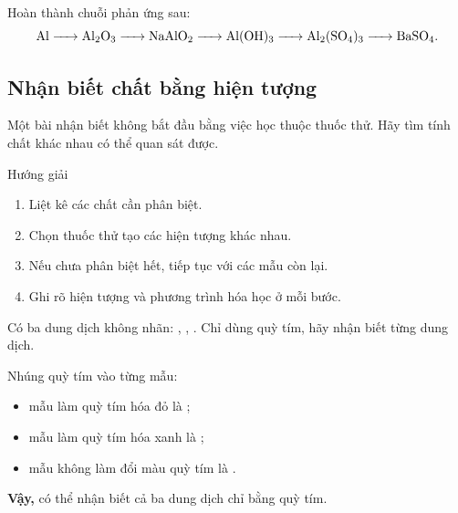 \begin{tuluyen}
Hoàn thành chuỗi phản ứng sau:
\[
\ce{Al -> Al2O3 -> NaAlO2 -> Al(OH)3 -> Al2(SO4)3 -> BaSO4}.
\]
\end{tuluyen}

\subsection{Nhận biết chất bằng hiện tượng}

Một bài nhận biết không bắt đầu bằng việc học thuộc thuốc thử. Hãy tìm tính chất khác nhau có thể quan sát được.

\begin{ghinho}{Hướng giải}
\begin{enumerate}
\item Liệt kê các chất cần phân biệt.
\item Chọn thuốc thử tạo các hiện tượng khác nhau.
\item Nếu chưa phân biệt hết, tiếp tục với các mẫu còn lại.
\item Ghi rõ hiện tượng và phương trình hóa học ở mỗi bước.
\end{enumerate}
\end{ghinho}

\begin{vidu}
Có ba dung dịch không nhãn: , , . Chỉ dùng quỳ tím, hãy nhận biết từng dung dịch.
\end{vidu}
\begin{loigiai}
Nhúng quỳ tím vào từng mẫu:
\begin{itemize}
\item mẫu làm quỳ tím hóa đỏ là ;
\item mẫu làm quỳ tím hóa xanh là ;
\item mẫu không làm đổi màu quỳ tím là .
\end{itemize}
\textbf{Vậy,} có thể nhận biết cả ba dung dịch chỉ bằng quỳ tím.
\end{loigiai}
